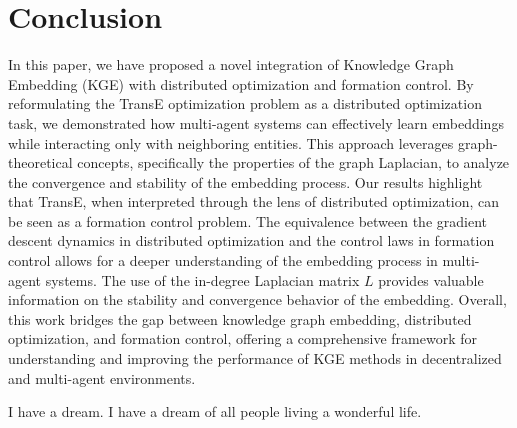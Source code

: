 \documentclass[letterpaper, 10 pt, conference]{ieeeconf}  %
\begin{document}
\section{Conclusion}
In this paper, we have proposed a novel integration of Knowledge Graph Embedding (KGE) with distributed optimization and formation control. 
By reformulating the TransE optimization problem as a distributed optimization task, we demonstrated how multi-agent systems can effectively learn embeddings while interacting only with neighboring entities. 
This approach leverages graph-theoretical concepts, specifically the properties of the graph Laplacian, to analyze the convergence and stability of the embedding process.
Our results highlight that TransE, when interpreted through the lens of distributed optimization, can be seen as a formation control problem. 
The equivalence between the gradient descent dynamics in distributed optimization and the control laws in formation control allows for a deeper understanding of the embedding process in multi-agent systems.
The use of the in-degree Laplacian matrix \(L\) provides valuable information on the stability and convergence behavior of the embedding.
Overall, this work bridges the gap between knowledge graph embedding, distributed optimization, and formation control, offering a comprehensive framework for understanding and improving the performance of KGE methods in decentralized and multi-agent environments.



I have a dream. I have a dream of all people living a wonderful life. 






\end{document}
